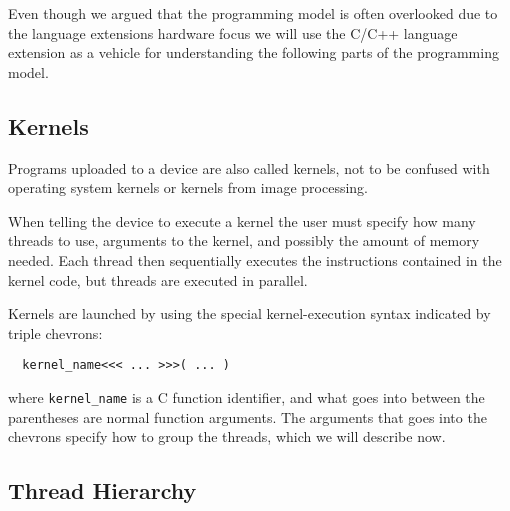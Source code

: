 Even though we argued that the programming model is often
overlooked due to the language extensions hardware focus we
will use the C/C++ language extension as a vehicle for
understanding the following parts of the programming model. 

\subsection{Kernels}

Programs uploaded to a device are also called kernels, not
to be confused with operating system kernels or kernels from
image processing.

When telling the device to execute a kernel the user must
specify how many threads to use, arguments to the kernel,
and possibly the amount of memory needed. Each thread then
sequentially executes the instructions contained in the
kernel code, but threads are executed in parallel.

Kernels are launched by using the special kernel-execution
syntax indicated by triple chevrons:
%
\begin{verbatim}
  kernel_name<<< ... >>>( ... )
\end{verbatim}
%
where \texttt{kernel\_name} is a C function identifier, and
what goes into between the parentheses are normal function
arguments. The arguments that goes into the chevrons specify
how to group the threads, which we will describe now.


\subsection{Thread Hierarchy}

